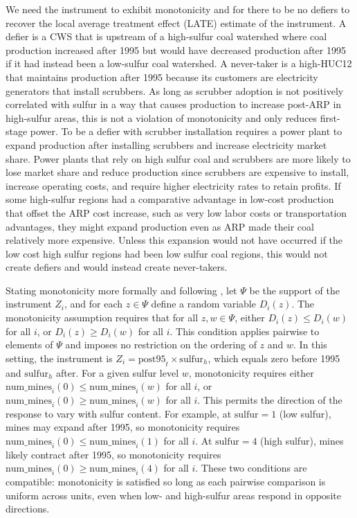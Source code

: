 \documentclass{article}
\begin{document}
We need the instrument to exhibit monotonicity and for there to be no defiers to recover the local average treatment effect (LATE) estimate of the instrument. A defier is a CWS that is upstream of a high-sulfur coal watershed where coal production increased after 1995 but would have decreased production after 1995 if it had instead been a low-sulfur coal watershed. A never-taker is a high-HUC12 that maintains production after 1995 because its customers are electricity generators that install scrubbers. As long as scrubber adoption is not positively correlated with sulfur in a way that causes production to increase post-ARP in high-sulfur areas, this is not a violation of monotonicity and only reduces first-stage power. To be a defier with scrubber installation requires a power plant to expand production after installing scrubbers and increase electricity market share. Power plants that rely on high sulfur coal and scrubbers are more likely to lose market share and reduce production since scrubbers are expensive to install, increase operating costs, and require higher electricity rates to retain profits. If some high-sulfur regions had a comparative advantage in low-cost production that offset the ARP cost increase, such as very low labor costs or transportation advantages, they might expand production even as ARP made their coal relatively more expensive. Unless this expansion would not have occurred if the low cost high sulfur regions had been low sulfur coal regions, this would not create defiers and would instead create never-takers.

Stating monotonicity more formally and following \cite{angrist1994identification}, let $\Psi$ be the support of the instrument $Z_i$, and for each $z \in \Psi$ define a random variable $D_i(z)$. The monotonicity assumption requires that for all $z, w \in \Psi$, either $D_i(z) \leq D_i(w)$ for all $i$, or $D_i(z) \geq D_i(w)$ for all $i$. This condition applies pairwise to elements of $\Psi$ and imposes no restriction on the ordering of $z$ and $w$. In this setting, the instrument is $Z_i = \text{post95}_t \times \text{sulfur}_h$, which equals zero before 1995 and $\text{sulfur}_h$ after. For a given sulfur level $w$, monotonicity requires either $\text{num_mines}_i(0) \leq \text{num_mines}_i(w)$ for all $i$, or $\text{num_mines}_i(0) \geq \text{num_mines}_i(w)$ for all $i$. This permits the direction of the response to vary with sulfur content. For example, at $\text{sulfur} = 1$ (low sulfur), mines may expand after 1995, so monotonicity requires $\text{num_mines}_i(0) \leq \text{num_mines}_i(1)$ for all $i$. At $\text{sulfur} = 4$ (high sulfur), mines likely contract after 1995, so monotonicity requires $\text{num_mines}_i(0) \geq \text{num_mines}_i(4)$ for all $i$. These two conditions are compatible: monotonicity is satisfied so long as each pairwise comparison is uniform across units, even when low- and high-sulfur areas respond in opposite directions.
\end{document}
